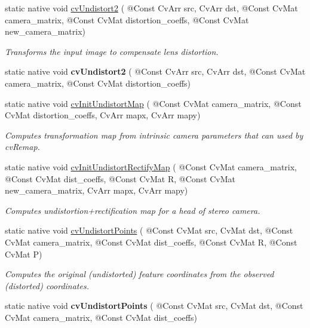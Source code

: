 \begin{DoxyCompactItemize}
\item 
static native void \hyperlink{group__imgproc__c_ga2b891154762834fb030334ea95ebdce9}{cv\+Undistort2} ( @Const Cv\+Arr src, Cv\+Arr dst, @Const Cv\+Mat camera\+\_\+matrix, @Const Cv\+Mat distortion\+\_\+coeffs, @Const Cv\+Mat new\+\_\+camera\+\_\+matrix)
\begin{DoxyCompactList}\small\item\em Transforms the input image to compensate lens distortion. \end{DoxyCompactList}\item 
static native void {\bfseries cv\+Undistort2} ( @Const Cv\+Arr src, Cv\+Arr dst, @Const Cv\+Mat camera\+\_\+matrix, @Const Cv\+Mat distortion\+\_\+coeffs)
\item 
static native void \hyperlink{group__imgproc__c_gabf5495653e45cb87934afd107d253eba}{cv\+Init\+Undistort\+Map} ( @Const Cv\+Mat camera\+\_\+matrix, @Const Cv\+Mat distortion\+\_\+coeffs, Cv\+Arr mapx, Cv\+Arr mapy)
\begin{DoxyCompactList}\small\item\em Computes transformation map from intrinsic camera parameters that can used by cv\+Remap. \end{DoxyCompactList}\item 
static native void \hyperlink{group__imgproc__c_gab25847a22028fe0d1088d6572aca641a}{cv\+Init\+Undistort\+Rectify\+Map} ( @Const Cv\+Mat camera\+\_\+matrix, @Const Cv\+Mat dist\+\_\+coeffs, @Const Cv\+Mat R, @Const Cv\+Mat new\+\_\+camera\+\_\+matrix, Cv\+Arr mapx, Cv\+Arr mapy)
\begin{DoxyCompactList}\small\item\em Computes undistortion+rectification map for a head of stereo camera. \end{DoxyCompactList}\item 
static native void \hyperlink{group__imgproc__c_ga21444b957a9e68dffef016a844ff35a1}{cv\+Undistort\+Points} ( @Const Cv\+Mat src, Cv\+Mat dst, @Const Cv\+Mat camera\+\_\+matrix, @Const Cv\+Mat dist\+\_\+coeffs, @Const Cv\+Mat R, @Const Cv\+Mat P)
\begin{DoxyCompactList}\small\item\em Computes the original (undistorted) feature coordinates from the observed (distorted) coordinates. \end{DoxyCompactList}\item 
static native void {\bfseries cv\+Undistort\+Points} ( @Const Cv\+Mat src, Cv\+Mat dst, @Const Cv\+Mat camera\+\_\+matrix, @Const Cv\+Mat dist\+\_\+coeffs)

\end{DoxyCompactItemize}
